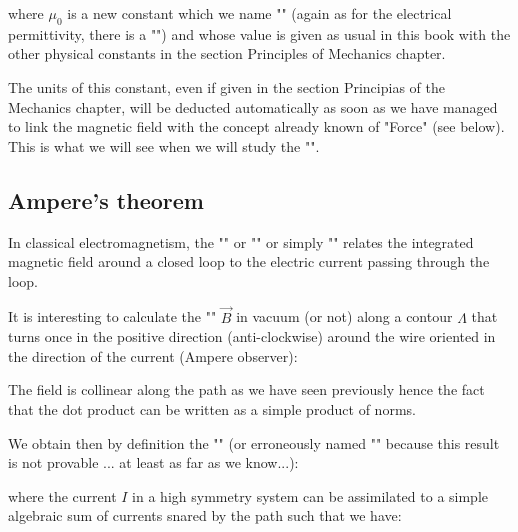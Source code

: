 	where $\mu_0$ is a new constant which we name "\label{magnetic permeability of vacuum}" (again as for the electrical permittivity, there is a "") and whose value is given as usual in this book with the other physical constants in the section Principles of Mechanics chapter.
	
	The units of this constant, even if given in the section Principias of the Mechanics chapter, will be deducted automatically as soon as we have managed to link the magnetic field with the concept already known of "Force" (see below). This is what we will see when we will study the "".
	
	\subsection{Ampere's theorem}\label{Ampère's law}
	In classical electromagnetism, the "" or "" or simply "" relates the integrated magnetic field around a closed loop to the electric current passing through the loop.
	
	It is interesting to calculate the "" $\vec{B}$ in vacuum (or not) along a contour $\Lambda$ that turns once in the positive direction (anti-clockwise) around the wire oriented in the direction of the current (Ampere observer):
	
	
	\begin{tcolorbox}[title=Remark,colframe=black,arc=10pt]
	The field is collinear along the path as we have seen previously hence the fact that the dot product can be written as a simple product of norms.
	\end{tcolorbox}
	We obtain then by definition the "" (or erroneously named "" because this result is not provable ... at least as far as we know...):
	
	where the current $I$ in a high symmetry system can be assimilated to a simple algebraic sum of currents snared by the path such that we have:
	
